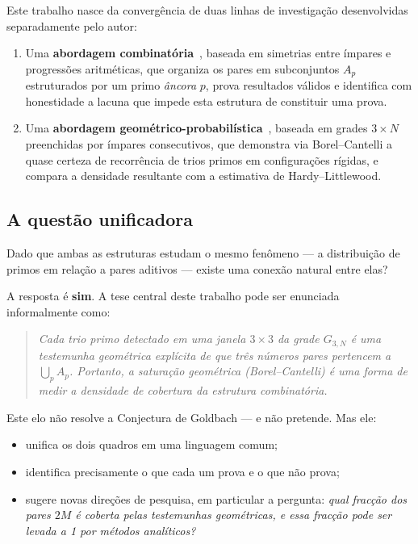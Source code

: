 \documentclass[12pt,a4paper]{article}
\theoremstyle{remark}
\begin{document}
	Este trabalho nasce da converg\^encia de duas linhas de investiga\c{c}\~ao desenvolvidas
	separadamente pelo autor:
	
	\begin{enumerate}[(1)]
		\item Uma \textbf{abordagem combinat\'oria}~\cite{bandeira2026estrutura}, baseada em simetrias
		entre \'impares e progress\~oes aritm\'eticas, que organiza os pares em subconjuntos
		$A_p$ estruturados por um primo \emph{\^ancora} $p$, prova resultados v\'alidos
		e identifica com honestidade a lacuna que impede esta estrutura de constituir uma prova.
		
		\item Uma \textbf{abordagem geom\'etrico-probabil\'istica}~\cite{bandeira2026geometrica},
		baseada em grades $3\times N$ preenchidas por \'impares consecutivos, que demonstra
		via Borel--Cantelli a quase certeza de recorr\^encia de trios primos em configura\c{c}\~oes
		r\'igidas, e compara a densidade resultante com a estimativa de Hardy--Littlewood.
	\end{enumerate}
	
	\subsection*{A quest\~ao unificadora}
	
	Dado que ambas as estruturas estudam o mesmo fen\^omeno --- a distribui\c{c}\~ao de primos
	em rela\c{c}\~ao a pares aditivos --- existe uma conex\~ao natural entre elas?
	
	A resposta \'e \textbf{sim}. A tese central deste trabalho pode ser enunciada informalmente como:
	
	\begin{quote}
		\itshape
		Cada trio primo detectado em uma janela $3\times3$ da grade $G_{3,N}$
		\'e uma testemunha geom\'etrica expl\'icita de que tr\^es n\'umeros pares
		pertencem a $\bigcup_p A_p$. Portanto, a satura\c{c}\~ao geom\'etrica (Borel--Cantelli)
		\'e uma forma de medir a \emph{densidade de cobertura} da estrutura combinat\'oria.
	\end{quote}
	
	Este elo n\~ao resolve a Conjectura de Goldbach --- e n\~ao pretende. Mas ele:
	\begin{itemize}
		\item unifica os dois quadros em uma linguagem comum;
		\item identifica precisamente o que cada um prova e o que n\~ao prova;
		\item sugere novas dire\c{c}\~oes de pesquisa, em particular a pergunta:
		\emph{qual frac\c{c}\~ao dos pares $2M$ \'e coberta pelas testemunhas
			geom\'etricas, e essa frac\c{c}\~ao pode ser levada a 1 por m\'etodos anal\'iticos?}
	\end{itemize}
	
\end{document}
